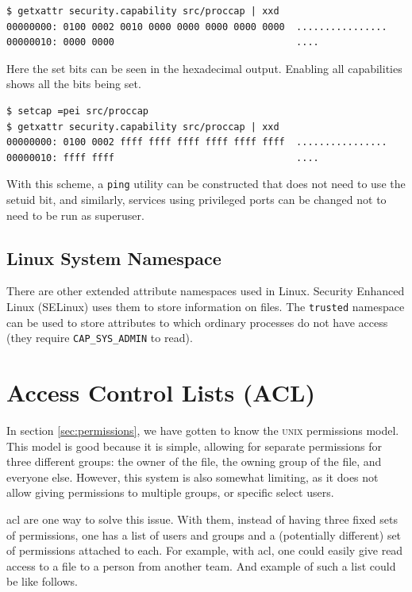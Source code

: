 \documentclass[a4paper]{article}
\begin{document}
\begin{verbatim}
$ getxattr security.capability src/proccap | xxd
00000000: 0100 0002 0010 0000 0000 0000 0000 0000  ................
00000010: 0000 0000                                ....  
\end{verbatim}
Here the set bits can be seen in the hexadecimal output. Enabling all capabilities shows all the bits being set.

\begin{verbatim}
$ setcap =pei src/proccap
$ getxattr security.capability src/proccap | xxd
00000000: 0100 0002 ffff ffff ffff ffff ffff ffff  ................
00000010: ffff ffff                                ....  
\end{verbatim}
With this scheme, a \verb|ping| utility can be constructed that does not need to use the setuid bit, and similarly, services using privileged ports can be changed not to need to be run as superuser.

\subsection{Linux System Namespace}

There are other extended attribute namespaces used in Linux. Security Enhanced Linux (SELinux) uses them to store information on files. The \verb|trusted| namespace can be used to store attributes to which ordinary processes do not have access (they require \verb|CAP_SYS_ADMIN| to read).

\section{Access Control Lists (ACL)}

In section \ref{sec:permissions}, we have gotten to know the \textsc{unix} permissions model. This model is good because it is simple, allowing for separate permissions for three different groups: the owner of the file, the owning group of the file, and everyone else. However, this system is also somewhat limiting, as it does not allow giving permissions to multiple groups, or specific select users.

\gls{acl} are one way to solve this issue. With them, instead of having three fixed sets of permissions, one has a list of users and groups and a (potentially different) set of permissions attached to each. For example, with \gls{acl}, one could easily give read access to a file to a person from another team. And example of such a list could be like follows.
\end{document}
